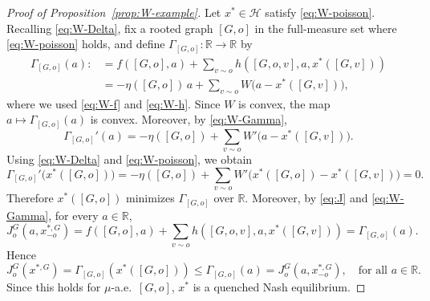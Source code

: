 \documentclass[11pt]{article}
\newcommand{\R}{{\mathbb R}}
\newcommand{\be}{\begin{equation}}
\newcommand{\ee}{\end{equation}}
\numberwithin{equation}{section}
\begin{document}
\begin{proof}[Proof of Proposition~\ref{prop:W-example}]
Let \(x^\ast\in\mathcal H\) satisfy \eqref{eq:W-poisson}. Recalling \eqref{eq:W-Delta}, fix a rooted graph \([G,o]\) in the full-measure set where \eqref{eq:W-poisson} holds, and define $\Gamma_{[G,o]}:\R\to\R$ by
\be\begin{aligned}\label{eq:W-Gamma}
\Gamma_{[G,o]}(a)
:&=
f([G,o],a)+\sum_{v\sim o}h([G,o,v],a,x^\ast([G,v]))
\\&=
-\eta([G,o])\,a+\sum_{v\sim o}W\!\big(a-x^\ast([G,v])\big),
\end{aligned}\ee
where we used \eqref{eq:W-f} and \eqref{eq:W-h}. Since \(W\) is convex, the map \(a\mapsto \Gamma_{[G,o]}(a)\) is convex. Moreover, by \eqref{eq:W-Gamma},
\[
\Gamma_{[G,o]}'(a)
=
-\eta([G,o])+\sum_{v\sim o}W'\!\big(a-x^\ast([G,v])\big).
\]
Using \eqref{eq:W-Delta} and \eqref{eq:W-poisson}, we obtain
\[
\Gamma_{[G,o]}'\big(x^\ast([G,o])\big)
=
-\eta([G,o])+\sum_{v\sim o}W'\!\big(x^\ast([G,o])-x^\ast([G,v])\big)
=
0.
\]
Therefore \(x^\ast([G,o])\) minimizes \(\Gamma_{[G,o]}\) over \(\mathbb R\). Moreover, by \eqref{eq:J} and \eqref{eq:W-Gamma}, for every \(a\in\mathbb R\),
\[
J_o^G(a,x_{-o}^{\ast,G})
=
f([G,o],a)+\sum_{v\sim o}h([G,o,v],a,x^\ast([G,v]))
=
\Gamma_{[G,o]}(a).
\]
Hence
\[
J_o^G(x^{\ast,G})=\Gamma_{[G,o]}(x^\ast([G,o]))
\le \Gamma_{[G,o]}(a)=J_o^G(a,x_{-o}^{\ast,G}),
\quad \text{for all } a\in\mathbb R.
\]
Since this holds for $\mu$-a.e.~\([G,o]\), \(x^\ast\) is a quenched Nash equilibrium.
\end{proof}
\end{document}
